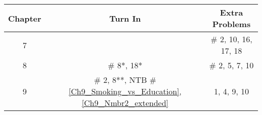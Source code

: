 \documentclass[12pt]{article}
\begin{document}
\begin{center}
\begin{tabular}{|c|c||c|}
\hline
Chapter & Turn In & Extra Problems\\
\hline



%

7 &    & \#  2, 10, 16, 17, 18\\
\hline	
8  & \# 8*, 18* & \# 2, 5, 7, 10\\
\hline	
9 & \# 2, 8**, NTB \# \ref{Ch9_Smoking_vs_Education}, \ref{Ch9_Nmbr2_extended}  & 1, 4, 9, 10\\
\hline




\end{tabular}
\end{center}
\end{document}

